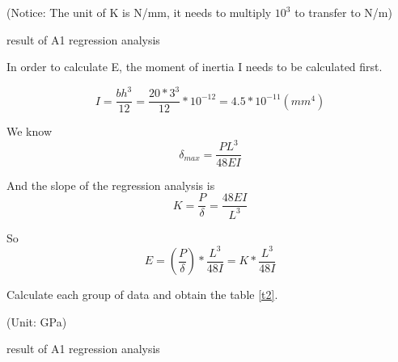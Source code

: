\begin{minipage}[htbp]{\textwidth}
    \makeatletter{}
    \centering
    
    (Notice: The unit of K is N/mm, it needs to multiply $10^3$ to transfer to N/m)
    \caption{result of A1 regression analysis}
    \label{t1} 
\end{minipage}

In order to calculate E, the moment of inertia I needs to be calculated first.

\begin{equation} 
I=\frac{bh^3}{12}=\frac{20*3^3}{12}*10^{-12}=4.5*10^{-11} (mm^4)
\end{equation}

We know 
\begin{equation} 
    \delta_{max}=\frac{PL^3}{48EI}
\end{equation}

And the slope of the regression analysis is
\begin{equation} 
    K=\frac{P}{\delta}=\frac{48EI}{L^3}
\end{equation}

So
\begin{equation} 
    E=(\frac{P}{\delta})*\frac{L^3}{48I}=K*\frac{L^3}{48I}
\end{equation}

Calculate each group of data and obtain the table \ref{t2}.

\begin{minipage}[htbp]{\textwidth}
    \makeatletter{}
    \centering
    
    (Unit: GPa)
    \caption{result of A1 regression analysis}
    \label{t2} 
\end{minipage}


